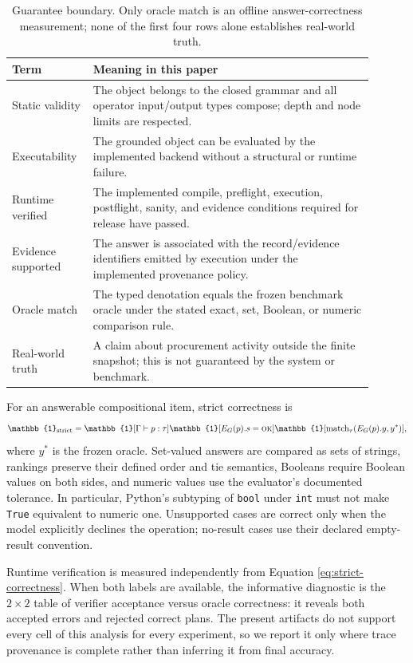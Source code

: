 \begin{table}[t]
  \caption{Guarantee boundary.  Only oracle match is an offline answer-correctness measurement;
  none of the first four rows alone establishes real-world truth.}
  \label{tab:guarantee-boundary}
  \centering
  \small
  \begin{tabular}{p{0.18\linewidth}p{0.72\linewidth}}
    \toprule
    Term & Meaning in this paper \\
    \midrule
    Static validity & The object belongs to the closed grammar and all operator input/output
    types compose; depth and node limits are respected. \\
    Executability & The grounded object can be evaluated by the implemented backend without a
    structural or runtime failure. \\
    Runtime verified & The implemented compile, preflight, execution, postflight, sanity, and
    evidence conditions required for release have passed. \\
    Evidence supported & The answer is associated with the record/evidence identifiers emitted
    by execution under the implemented provenance policy. \\
    Oracle match & The typed denotation equals the frozen benchmark oracle under the stated
    exact, set, Boolean, or numeric comparison rule. \\
    Real-world truth & A claim about procurement activity outside the finite snapshot; this is
    not guaranteed by the system or benchmark. \\
    \bottomrule
  \end{tabular}
\end{table}

For an answerable compositional item, strict correctness is
\begin{equation}
  \mathbb{1}_{\mathrm{strict}} =
  \mathbb{1}[\Gamma\vdash p:\tau]
  \mathbb{1}[E_G(p).s=\textsc{ok}]
  \mathbb{1}[\operatorname{match}_{\tau}(E_G(p).y,y^*)],
  \label{eq:strict-correctness}
\end{equation}
where $y^*$ is the frozen oracle.  Set-valued answers are compared as sets of strings, rankings
preserve their defined order and tie semantics, Booleans require Boolean values on both sides,
and numeric values use the evaluator's documented tolerance.  In particular, Python's
subtyping of \texttt{bool} under \texttt{int} must not make \texttt{True} equivalent to numeric
one.  Unsupported cases are correct only when the model explicitly declines the operation;
no-result cases use their declared empty-result convention.

Runtime verification is measured independently from Equation \ref{eq:strict-correctness}.  When
both labels are available, the informative diagnostic is the $2\times2$ table of verifier
acceptance versus oracle correctness: it reveals both accepted errors and rejected correct
plans.  The present artifacts do not support every cell of this analysis for every experiment,
so we report it only where trace provenance is complete rather than inferring it from final
accuracy.
